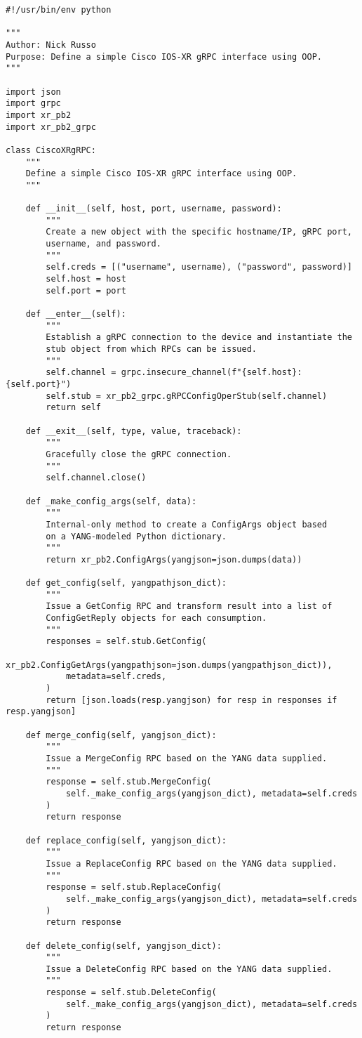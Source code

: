 \begin{verbatim}
#!/usr/bin/env python

"""
Author: Nick Russo
Purpose: Define a simple Cisco IOS-XR gRPC interface using OOP.
"""

import json
import grpc
import xr_pb2
import xr_pb2_grpc

class CiscoXRgRPC:
    """
    Define a simple Cisco IOS-XR gRPC interface using OOP.
    """

    def __init__(self, host, port, username, password):
        """
        Create a new object with the specific hostname/IP, gRPC port,
        username, and password.
        """
        self.creds = [("username", username), ("password", password)]
        self.host = host
        self.port = port

    def __enter__(self):
        """
        Establish a gRPC connection to the device and instantiate the
        stub object from which RPCs can be issued.
        """
        self.channel = grpc.insecure_channel(f"{self.host}:{self.port}")
        self.stub = xr_pb2_grpc.gRPCConfigOperStub(self.channel)
        return self

    def __exit__(self, type, value, traceback):
        """
        Gracefully close the gRPC connection.
        """
        self.channel.close()

    def _make_config_args(self, data):
        """
        Internal-only method to create a ConfigArgs object based
        on a YANG-modeled Python dictionary.
        """
        return xr_pb2.ConfigArgs(yangjson=json.dumps(data))

    def get_config(self, yangpathjson_dict):
        """
        Issue a GetConfig RPC and transform result into a list of
        ConfigGetReply objects for each consumption.
        """
        responses = self.stub.GetConfig(
            xr_pb2.ConfigGetArgs(yangpathjson=json.dumps(yangpathjson_dict)),
            metadata=self.creds,
        )
        return [json.loads(resp.yangjson) for resp in responses if resp.yangjson]

    def merge_config(self, yangjson_dict):
        """
        Issue a MergeConfig RPC based on the YANG data supplied.
        """
        response = self.stub.MergeConfig(
            self._make_config_args(yangjson_dict), metadata=self.creds
        )
        return response

    def replace_config(self, yangjson_dict):
        """
        Issue a ReplaceConfig RPC based on the YANG data supplied.
        """
        response = self.stub.ReplaceConfig(
            self._make_config_args(yangjson_dict), metadata=self.creds
        )
        return response

    def delete_config(self, yangjson_dict):
        """
        Issue a DeleteConfig RPC based on the YANG data supplied.
        """
        response = self.stub.DeleteConfig(
            self._make_config_args(yangjson_dict), metadata=self.creds
        )
        return response
\end{verbatim}

